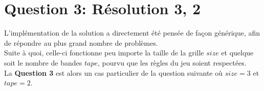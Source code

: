 \documentclass[a4paper,12pt]{report}
\begin{document}
\pagebreak



%
%
%
%
%
%
%
%

\chapter{Question 3: Résolution 3, 2}

L'implémentation de la solution a directement été pensée de façon générique, afin de répondre au plus grand nombre de problèmes.\\
Suite à quoi, celle-ci fonctionne peu importe la taille de la grille $size$ et quelque soit le nombre de bandes $tape$, pourvu que les règles du jeu soient respectées. \\

La \textbf{Question 3} est alors un cas particulier de la question suivante où $size=3$ et $tape=2$.\\
\end{document}
